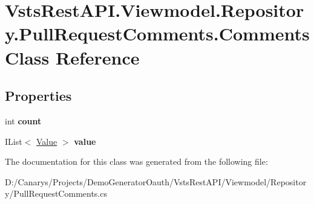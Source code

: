 \hypertarget{class_vsts_rest_a_p_i_1_1_viewmodel_1_1_repository_1_1_pull_request_comments_1_1_comments}{}\section{Vsts\+Rest\+A\+P\+I.\+Viewmodel.\+Repository.\+Pull\+Request\+Comments.\+Comments Class Reference}
\label{class_vsts_rest_a_p_i_1_1_viewmodel_1_1_repository_1_1_pull_request_comments_1_1_comments}
\subsection*{Properties}
\begin{DoxyCompactItemize}
\item 
\mbox{\label{class_vsts_rest_a_p_i_1_1_viewmodel_1_1_repository_1_1_pull_request_comments_1_1_comments_a3c4050e31769bb719eca764e5766c166}} 
int {\bfseries count}
\item 
\mbox{\label{class_vsts_rest_a_p_i_1_1_viewmodel_1_1_repository_1_1_pull_request_comments_1_1_comments_a8a44951f4e8e461b7afefece151f67a3}} 
I\+List$<$ \mbox{\hyperlink{class_vsts_rest_a_p_i_1_1_viewmodel_1_1_repository_1_1_pull_request_comments_1_1_value}{Value}} $>$ {\bfseries value}
\end{DoxyCompactItemize}


The documentation for this class was generated from the following file\+:\begin{DoxyCompactItemize}
\item 
D\+:/\+Canarys/\+Projects/\+Demo\+Generator\+Oauth/\+Vsts\+Rest\+A\+P\+I/\+Viewmodel/\+Repository/Pull\+Request\+Comments.\+cs\end{DoxyCompactItemize}
